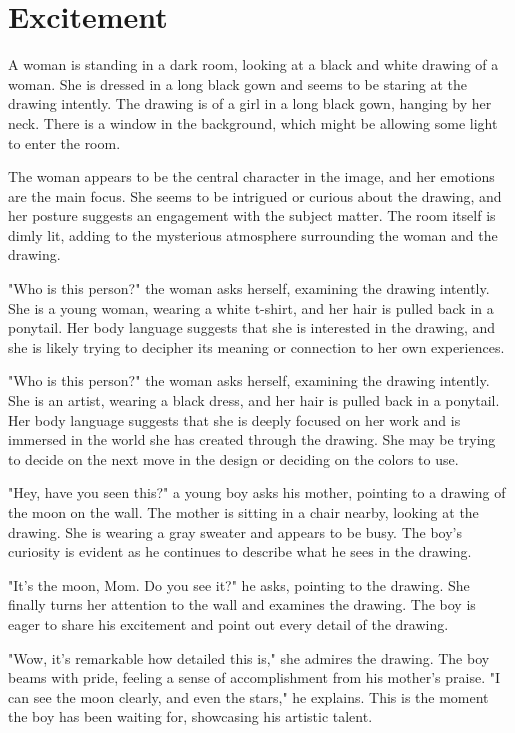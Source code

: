 \documentclass[smalldemyvopaper,11pt,twoside,onecolumn,openright,extrafontsizes]{memoir}
\begin{document}
\chapter{Excitement}
A woman is standing in a dark room, looking at a black and white drawing of a woman. She is dressed in a long black gown and seems to be staring at the drawing intently. The drawing is of a girl in a long black gown, hanging by her neck. There is a window in the background, which might be allowing some light to enter the room.\par
The woman appears to be the central character in the image, and her emotions are the main focus. She seems to be intrigued or curious about the drawing, and her posture suggests an engagement with the subject matter. The room itself is dimly lit, adding to the mysterious atmosphere surrounding the woman and the drawing.\par
"Who is this person?" the woman asks herself, examining the drawing intently. She is a young woman, wearing a white t-shirt, and her hair is pulled back in a ponytail. Her body language suggests that she is interested in the drawing, and she is likely trying to decipher its meaning or connection to her own experiences.\par
"Who is this person?" the woman asks herself, examining the drawing intently. She is an artist, wearing a black dress, and her hair is pulled back in a ponytail. Her body language suggests that she is deeply focused on her work and is immersed in the world she has created through the drawing. She may be trying to decide on the next move in the design or deciding on the colors to use.\par
"Hey, have you seen this?" a young boy asks his mother, pointing to a drawing of the moon on the wall. The mother is sitting in a chair nearby, looking at the drawing. She is wearing a gray sweater and appears to be busy. The boy's curiosity is evident as he continues to describe what he sees in the drawing.\par
"It's the moon, Mom. Do you see it?" he asks, pointing to the drawing. She finally turns her attention to the wall and examines the drawing. The boy is eager to share his excitement and point out every detail of the drawing.\par
"Wow, it's remarkable how detailed this is," she admires the drawing. The boy beams with pride, feeling a sense of accomplishment from his mother's praise. "I can see the moon clearly, and even the stars," he explains. This is the moment the boy has been waiting for, showcasing his artistic talent.\par
\end{document}
